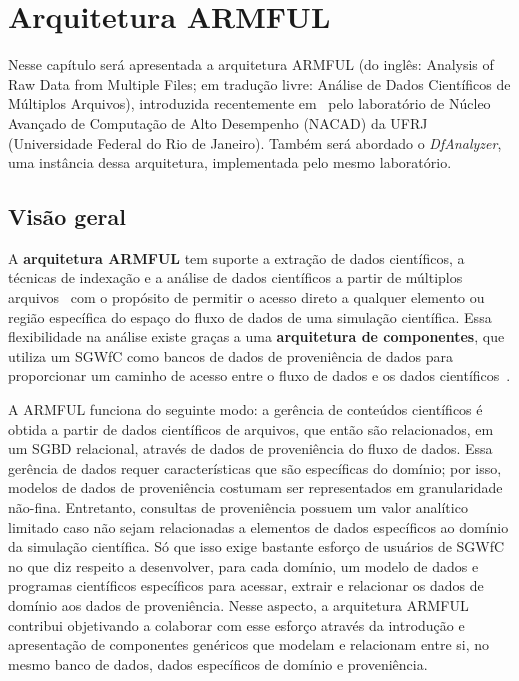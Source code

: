 
\chapter{Arquitetura ARMFUL}%
\label{chap:arquitetura-armful}

Nesse capítulo será apresentada a arquitetura  ARMFUL (do inglês: Analysis of Raw Data from Multiple Files; em tradução livre: Análise de Dados Científicos de Múltiplos Arquivos), introduzida recentemente em~\cite{silva2016situ,silva2017raw} pelo laboratório de  Núcleo Avançado de Computação de Alto Desempenho (NACAD) da  UFRJ (Universidade Federal do Rio de Janeiro). Também será abordado o \textit{DfAnalyzer}, uma instância dessa arquitetura, implementada pelo mesmo laboratório.

\section{Visão geral}

A \textbf{arquitetura ARMFUL} tem suporte a extração de dados científicos, a técnicas de indexação e a análise de dados científicos a partir de múltiplos arquivos~\cite{silva2016situ} com o propósito de permitir o acesso direto a qualquer elemento ou região específica do espaço do fluxo de dados de uma simulação científica. Essa flexibilidade na análise existe graças a uma \textbf{arquitetura de componentes}, que utiliza um SGWfC como bancos de dados de proveniência de dados para proporcionar um caminho de acesso entre o fluxo de dados e os dados científicos~\cite{silva2017raw}.

A ARMFUL funciona do seguinte modo: a gerência de conteúdos científicos é obtida a partir de dados científicos de arquivos, que então são relacionados, em um SGBD relacional, através de dados de proveniência do fluxo de dados. Essa gerência de dados requer características que são específicas do domínio; por isso, modelos de dados de proveniência costumam ser representados em granularidade não-fina. Entretanto, consultas de proveniência possuem um valor analítico limitado caso não sejam relacionadas a elementos de dados específicos ao domínio da simulação científica. Só que isso exige bastante esforço de usuários de SGWfC no que diz respeito a desenvolver, para cada domínio, um modelo de dados e programas científicos específicos para acessar, extrair e relacionar os dados de domínio aos dados de proveniência. Nesse aspecto, a arquitetura ARMFUL contribui objetivando a colaborar com esse esforço através da introdução e apresentação de componentes genéricos que modelam e relacionam entre si, no mesmo banco de dados, dados específicos de domínio e proveniência.

